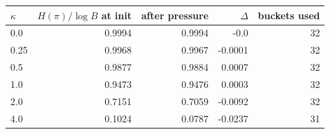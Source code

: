 \begin{tabular}{lrrrr}
\toprule
$\kappa$ & $H(\pi)/\log B$ at init & after pressure & $\Delta$ & buckets used \\
\midrule
0.0 & 0.9994 & 0.9994 & -0.0 & 32 \\
0.25 & 0.9968 & 0.9967 & -0.0001 & 32 \\
0.5 & 0.9877 & 0.9884 & 0.0007 & 32 \\
1.0 & 0.9473 & 0.9476 & 0.0003 & 32 \\
2.0 & 0.7151 & 0.7059 & -0.0092 & 32 \\
4.0 & 0.1024 & 0.0787 & -0.0237 & 31 \\
\bottomrule
\end{tabular}